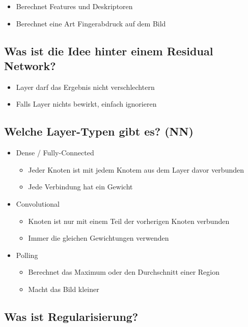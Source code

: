 \documentclass[a4paper]{article}
\begin{document}
		\begin{itemize}
			\item Berechnet Features und Deskriptoren
			\item Berechnet eine Art Fingerabdruck auf dem Bild
		\end{itemize}
	
		\subsection{Was ist die Idee hinter einem Residual Network?}
		
		\begin{itemize}
			\item Layer darf das Ergebnis nicht verschlechtern
			\item Falls Layer nichts bewirkt, einfach ignorieren
		\end{itemize}
	
		\subsection{Welche Layer-Typen gibt es? (NN)}
		
		\begin{itemize}
			\item Dense / Fully-Connected
				\begin{itemize}
					\item Jeder Knoten ist mit jedem Knotem aus dem Layer davor verbunden
					\item Jede Verbindung hat ein Gewicht
				\end{itemize}
			\item Convolutional
				\begin{itemize}
					\item Knoten ist nur mit einem Teil der vorherigen Knoten verbunden
					\item Immer die gleichen Gewichtungen verwenden
				\end{itemize}
			\item Polling
				\begin{itemize}
					\item Berechnet das Maximum oder den Durchschnitt einer Region
					\item Macht das Bild kleiner
				\end{itemize}
		\end{itemize}
	
		\subsection{Was ist Regularisierung?}
		
\end{document}
